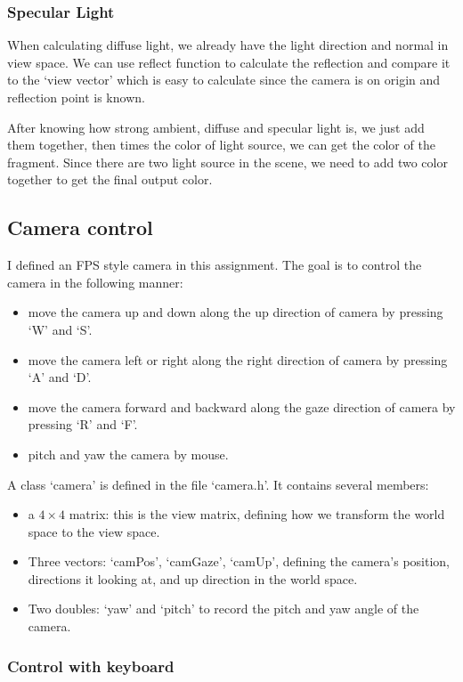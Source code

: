 \documentclass[acmtog]{acmart}
\begin{document}
\subsubsection{Specular Light}
When calculating diffuse light, we already have the light direction and normal in view space. We can use reflect function to calculate the reflection and compare it to the `view vector' which is easy to calculate since the camera is on origin and reflection point is known. 


After knowing how strong ambient, diffuse and specular light is, we just add them together, then times the color of light source, we can get the color of the fragment. Since there are two light source in the scene, we need to add two color together to get the final output color.

\subsection{Camera control}

I defined an FPS style camera in this assignment. The goal is to control the camera in the following manner:
\begin{itemize}
	\item move the camera up and down along the up direction of camera by pressing `W' and `S'.
	\item move the camera left or right along the right direction of camera by pressing `A' and `D'.
	\item move the camera forward and backward along the gaze direction of camera by pressing `R' and `F'.
	\item pitch and yaw the camera by mouse.
\end{itemize}

A class `camera' is defined in the file `camera.h'. It contains several members:
\begin{itemize}
	\item a $4\times4$ matrix: this is the view matrix, defining how we transform the world space to the view space.
	\item Three vectors: `camPos', `camGaze', `camUp', defining the camera's position, directions it looking at, and up direction in the world space.
	\item Two doubles: `yaw' and `pitch' to record the pitch and yaw angle of the camera.
\end{itemize}

\subsubsection{Control with keyboard}
\end{document}
